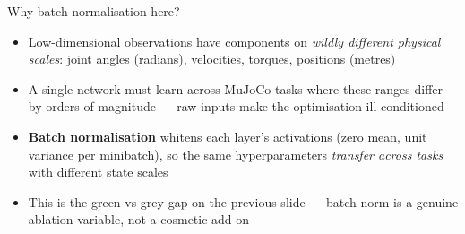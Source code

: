 \begin{frame}{Why batch normalisation here?}
\vspace{0.4em}
\begin{itemize}
    \item Low-dimensional observations have components on \emph{wildly different physical scales}: joint angles (radians), velocities, torques, positions (metres)
    \vspace{0.3em}
    \item A single network must learn across MuJoCo tasks where these ranges differ by orders of magnitude --- raw inputs make the optimisation ill-conditioned
    \vspace{0.3em}
    \item \textbf{Batch normalisation} whitens each layer's activations (zero mean, unit variance per minibatch), so the same hyperparameters \emph{transfer across tasks} with different state scales
    \vspace{0.3em}
    \item This is the green-vs-grey gap on the previous slide --- batch norm is a genuine ablation variable, not a cosmetic add-on
\end{itemize}
\end{frame}
